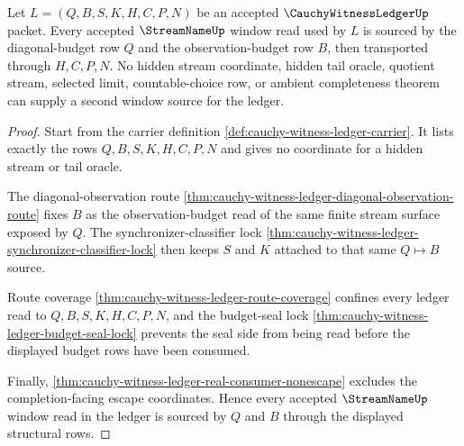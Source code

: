 \begin{theorem}
\label{thm:cauchy-witness-ledger-streamname-window-source-lock}
Let $L=(Q,B,S,K,H,C,P,N)$ be an accepted
$\CauchyWitnessLedgerUp$ packet. Every accepted $\StreamNameUp$ window read
used by $L$ is sourced by the diagonal-budget row $Q$ and the
observation-budget row $B$, then transported through $H,C,P,N$. No hidden
stream coordinate, hidden tail oracle, quotient stream, selected limit,
countable-choice row, or ambient completeness theorem can supply a second
window source for the ledger.
\end{theorem}
\begin{proof}
Start from the carrier definition \autoref{def:cauchy-witness-ledger-carrier}.
It lists exactly the rows $Q,B,S,K,H,C,P,N$ and gives no coordinate for a
hidden stream or tail oracle.

The diagonal-observation route
\autoref{thm:cauchy-witness-ledger-diagonal-observation-route} fixes $B$ as
the observation-budget read of the same finite stream surface exposed by
$Q$. The synchronizer-classifier lock
\autoref{thm:cauchy-witness-ledger-synchronizer-classifier-lock} then keeps
$S$ and $K$ attached to that same $Q \longmapsto B$ source.

Route coverage \autoref{thm:cauchy-witness-ledger-route-coverage} confines
every ledger read to $Q,B,S,K,H,C,P,N$, and the budget-seal lock
\autoref{thm:cauchy-witness-ledger-budget-seal-lock} prevents the seal side
from being read before the displayed budget rows have been consumed.

Finally, \autoref{thm:cauchy-witness-ledger-real-consumer-nonescape} excludes
the completion-facing escape coordinates. Hence every accepted
$\StreamNameUp$ window read in the ledger is sourced by $Q$ and $B$ through
the displayed structural rows.
\end{proof}

